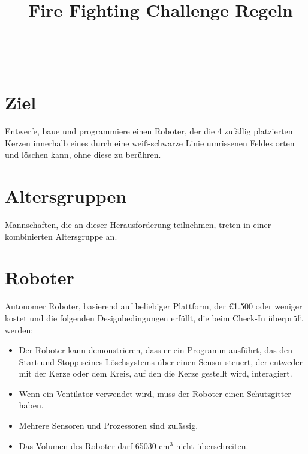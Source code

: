 \documentclass[a4paper,12pt]{article}
\begin{document}


\title{\tagYear\ Fire Fighting Challenge Regeln}

\makeatletter
\let\inserttitle\@title
\makeatother
\begin{center}
	\rrgerLogo
	\huge                      %
	\bfseries                   %
	\\
	\inserttitle
\end{center}

\section{Ziel}
Entwerfe, baue und programmiere einen Roboter, der die 4 zufällig platzierten
Kerzen innerhalb eines durch eine weiß-schwarze Linie umrissenen Feldes orten
und löschen kann, ohne diese zu berühren.

\section{Altersgruppen}
Mannschaften, die an dieser Herausforderung teilnehmen, treten in einer
kombinierten Altersgruppe an.

\section{Roboter}
Autonomer Roboter, basierend auf beliebiger Plattform, der \euro{1.500}  oder
weniger kostet und die folgenden Designbedingungen erfüllt, die beim Check-In
überprüft werden:
\begin{itemize}
	\item Der Roboter kann demonstrieren, dass er ein Programm ausführt,
		das den Start und Stopp seines Löschsystems über einen Sensor
		steuert, der entweder mit der Kerze oder dem Kreis, auf den die
		Kerze gestellt wird, interagiert.
	\item Wenn ein Ventilator verwendet wird, muss der Roboter einen
		Schutzgitter haben.
	\item Mehrere Sensoren und Prozessoren sind zulässig.
	\item Das Volumen des Roboter darf 65030 cm$^{3}$ nicht überschreiten.
\end{itemize}
\end{document}
